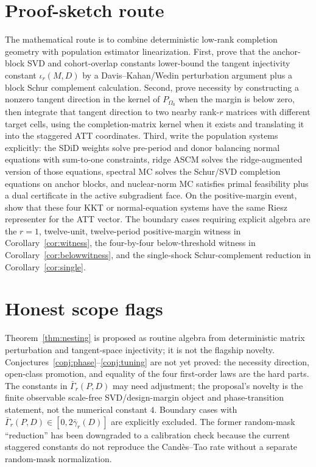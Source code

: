 \documentclass[11pt]{article}
\theoremstyle{definition}
\theoremstyle{plain}
\theoremstyle{remark}
\begin{document}
\section{Proof-sketch route}
The mathematical route is to combine deterministic low-rank completion
geometry with population estimator linearization. First, prove that the
anchor-block SVD and cohort-overlap constants lower-bound the tangent
injectivity constant $\iota_r(M,D)$ by a Davis--Kahan/Wedin perturbation
argument plus a block Schur complement calculation. Second, prove necessity by
constructing a nonzero tangent direction in the kernel of $P_{\Omega_0}$ when
the margin is below zero, then integrate that tangent direction to two nearby
rank-$r$ matrices with different target cells, using the completion-matrix
kernel when it exists and translating it into the staggered ATT coordinates.
Third, write the population systems explicitly: the SDiD weights solve
pre-period and donor balancing normal equations with sum-to-one constraints,
ridge ASCM solves the ridge-augmented version of those equations, spectral MC
solves the Schur/SVD completion equations on anchor blocks, and nuclear-norm
MC satisfies primal feasibility plus a dual certificate in the active
subgradient face. On the positive-margin event, show that these four KKT or
normal-equation systems have the same Riesz representer for the ATT vector.
The boundary cases requiring explicit algebra are the $r=1$, twelve-unit,
twelve-period positive-margin witness in Corollary~\ref{cor:witness}, the
four-by-four below-threshold witness in Corollary~\ref{cor:belowwitness}, and
the single-shock Schur-complement reduction in Corollary~\ref{cor:single}.

\section{Honest scope flags}
Theorem~\ref{thm:nesting} is proposed as routine algebra from deterministic
matrix perturbation and tangent-space injectivity; it is not the flagship
novelty. Conjectures~\ref{conj:phase}--\ref{conj:tuning} are not yet proved:
the necessity direction, open-class promotion, and equality of the four
first-order laws are the hard parts. The constants in $\bar\Gamma_r(P,D)$ may
need adjustment; the proposal's novelty is the finite observable
scale-free SVD/design-margin object and phase-transition statement, not the
numerical constant $4$. Boundary cases with
$\bar\Gamma_r(P,D)\in[0,2\bar\gamma_r(D)]$ are explicitly excluded.
The former random-mask ``reduction'' has been downgraded to a calibration
check because the current staggered constants do not reproduce the
Cand\`es--Tao rate without a separate random-mask normalization.
\end{document}
